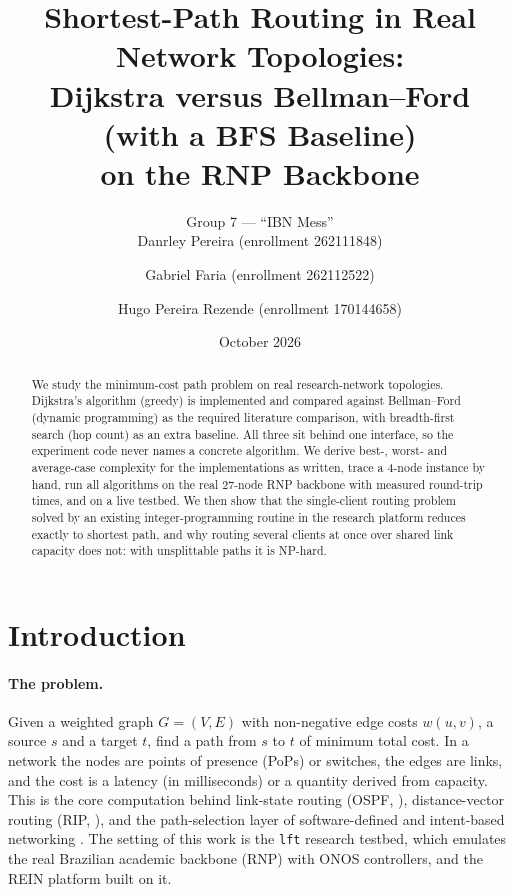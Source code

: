 \documentclass[11pt,a4paper]{article}
\title{%
  Shortest-Path Routing in Real Network Topologies: \\
  Dijkstra versus Bellman--Ford (with a BFS Baseline) \\
  on the RNP Backbone}
\author{Group 7 --- ``IBN Mess'' \\
  Danrley Pereira (enrollment 262111848) \and
  Gabriel Faria (enrollment 262112522) \and
  Hugo Pereira Rezende (enrollment 170144658)}
\date{October 2026}
\begin{document}
\maketitle

\begin{abstract}
We study the minimum-cost path problem on real research-network topologies. Dijkstra's
algorithm (greedy) is implemented and compared against Bellman--Ford (dynamic programming)
as the required literature comparison, with breadth-first search (hop count) as an extra
baseline. All three sit behind one interface, so the experiment code never names a concrete
algorithm. We derive best-, worst- and average-case complexity for the implementations as
written, trace a 4-node instance by hand, run all algorithms on the real 27-node RNP
backbone with measured round-trip times, and on a live testbed. We then show that the
single-client routing problem solved by an existing integer-programming routine in the
research platform reduces exactly to shortest path, and why routing several clients at
once over shared link capacity does not: with unsplittable paths it is NP-hard.
\end{abstract}

\section{Introduction}
\label{sec:intro}

\paragraph{The problem.}
Given a weighted graph $G=(V,E)$ with non-negative edge costs $w(u,v)$, a source $s$ and a
target $t$, find a path from $s$ to $t$ of minimum total cost. In a network the nodes are
points of presence (PoPs) or switches, the edges are links, and the cost is a latency
(in milliseconds) or a quantity derived from capacity. This is the core computation behind
link-state routing (OSPF, \cite{rfc2328}), distance-vector routing (RIP, \cite{rfc2453}),
and the path-selection layer of software-defined and intent-based networking
\cite{mckeown2008openflow,berde2014onos,rivera2023ibn}. The setting of this work is the
\texttt{lft} research testbed, which emulates the real Brazilian academic backbone (RNP)
with ONOS controllers, and the REIN platform built on it.
\end{document}
